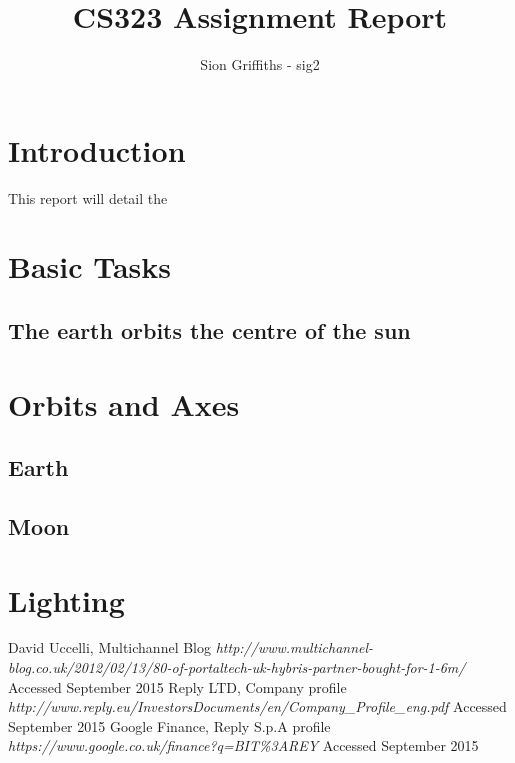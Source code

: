\documentclass[titlepage]{article}
\title{CS323 Assignment Report}
\author{Sion Griffiths - sig2}
\begin{document}
\maketitle
\tableofcontents




\newpage
\section{Introduction}

This report will detail the 

\section{Basic Tasks}
\subsection{The earth orbits the centre of the sun}


\section{Orbits and Axes}
\subsection{Earth}
\subsection{Moon}

\section{Lighting}



 \begin{thebibliography}{1}
 	
 	 David Uccelli, Multichannel Blog {\em http://www.multichannel-blog.co.uk/2012/02/13/80-of-portaltech-uk-hybris-partner-bought-for-1-6m/} Accessed September 2015
 	 Reply LTD, Company profile {\em http://www.reply.eu/InvestorsDocuments/en/Company\_Profile\_eng.pdf} Accessed September 2015
 	 Google Finance, Reply S.p.A profile {\em https://www.google.co.uk/finance?q=BIT\%3AREY} Accessed September 2015
 	
 	
 	
 	
 		

	


 \end{thebibliography}
\end{document}
